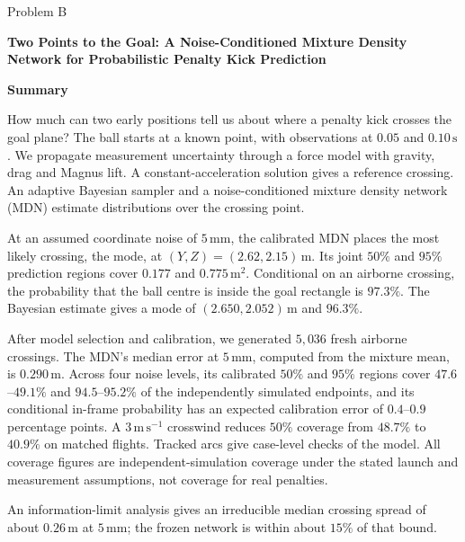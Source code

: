 \documentclass[11pt,a4paper]{article}
\newcommand{\problemletter}{B}
\newcommand{\papertitle}{Two Points to the Goal: A Noise-Conditioned Mixture Density Network for Probabilistic Penalty Kick Prediction}
\begin{document}
\thispagestyle{cover}
\begin{center}
  \vspace*{1.0cm}
  {\large Problem \problemletter\par}
  \vspace{1.2cm}
  {\LARGE\bfseries \papertitle\par}
  \vspace{1.2cm}
  {\large\bfseries Summary\par}
\end{center}
\vspace{0.2cm}

How much can two early positions tell us about where a penalty kick crosses the goal plane? The ball starts at a known point, with observations at $0.05$ and $0.10\,\mathrm{s}$. We propagate measurement uncertainty through a force model with gravity, drag and Magnus lift. A constant-acceleration solution gives a reference crossing. An adaptive Bayesian sampler and a noise-conditioned mixture density network (MDN) estimate distributions over the crossing point.

At an assumed coordinate noise of $5\,\mathrm{mm}$, the calibrated MDN places the most likely crossing, the mode, at $(Y,Z)=(2.62,2.15)\,\mathrm{m}$. Its joint $50\%$ and $95\%$ prediction regions cover $0.177$ and $0.775\,\mathrm{m^2}$. Conditional on an airborne crossing, the probability that the ball centre is inside the goal rectangle is $97.3\%$. The Bayesian estimate gives a mode of $(2.650,2.052)\,\mathrm{m}$ and $96.3\%$.

After model selection and calibration, we generated $5{,}036$ fresh airborne crossings. The MDN's median error at $5\,\mathrm{mm}$, computed from the mixture mean, is $0.290\,\mathrm{m}$. Across four noise levels, its calibrated $50\%$ and $95\%$ regions cover $47.6$--$49.1\%$ and $94.5$--$95.2\%$ of the independently simulated endpoints, and its conditional in-frame probability has an expected calibration error of $0.4$--$0.9$ percentage points. A $3\,\mathrm{m\,s^{-1}}$ crosswind reduces $50\%$ coverage from $48.7\%$ to $40.9\%$ on matched flights. Tracked arcs give case-level checks of the model. All coverage figures are independent-simulation coverage under the stated launch and measurement assumptions, not coverage for real penalties.

An information-limit analysis gives an irreducible median crossing spread of about $0.26\,\mathrm{m}$ at $5\,\mathrm{mm}$; the frozen network is within about $15\%$ of that bound.
\end{document}

